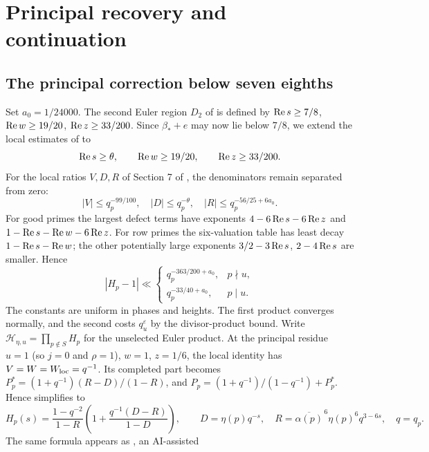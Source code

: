 \section{Principal recovery and continuation}\label{gex:recovery-section}

\subsection{The principal correction below seven eighths}

Set \(a_0=1/24000\). The second Euler region \(D_2\) of
\cite[Section 10.2 and (7.15)]{OAI26} is defined by
\(\operatorname{Re} s\ge7/8\), \(\operatorname{Re} w\ge19/20\), \(\operatorname{Re} z\ge33/200\). Since
\(\beta_*+e\) may now lie below \(7/8\), we extend the local estimates
of \cite[Sections 7 and 16]{OAI26} to
\begin{equation}\label{gex:second-euler-box}
 \operatorname{Re} s\ge\theta,\qquad \operatorname{Re} w\ge19/20,\qquad \operatorname{Re} z\ge33/200.
\end{equation}
For the local ratios \(V,D,R\) of Section 7 of \cite{OAI26},
the denominators remain separated from zero:
\[
 |V|\le q_p^{-99/100},\quad |D|\le q_p^{-\theta},\quad
 |R|\le q_p^{-56/25+6a_0}.
\]
For good primes the largest defect terms have exponents
\(4-6\operatorname{Re} s-6\operatorname{Re} z\) and
\(1-\operatorname{Re} s-\operatorname{Re} w-6\operatorname{Re} z\).
For row primes the six-valuation table has least decay
\(1-\operatorname{Re} s-\operatorname{Re} w\); the other potentially large exponents
\(3/2-3\operatorname{Re} s\), \(2-4\operatorname{Re} s\) are smaller. Hence
\begin{equation}\label{gex:local-euler-defect}
 |H_p-1|\ll
 \begin{cases}
 q_p^{-363/200+a_0},&p\nmid u,\\
 q_p^{-33/40+a_0},&p\mid u.
 \end{cases}
\end{equation}
The constants are uniform in phases and heights. The first product
converges normally, and the second costs \(q_u^\varepsilon\)
by the divisor-product bound. Write \(\mathcal H_{\eta,u}=\prod_{p\notin S}H_p\)
for the unselected Euler product. At the principal residue
\(u=1\) (so \(j=0\) and \(\rho=1\)), \(w=1\), \(z=1/6\), the local
identity \cite[(7.11)--(7.12)]{OAI26} has
\(V=W=W_{\rm loc}=q^{-1}\). Its completed part becomes
\(P_p^*=(1+q^{-1})(R-D)/(1-R)\), and
\(P_p=(1+q^{-1})/(1-q^{-1})+P_p^*\). Hence \cite[(7.12)]{OAI26}
simplifies to
\[
 H_p(s)=\frac{1-q^{-2}}{1-R}
       \left(1+\frac{q^{-1}(D-R)}{1-D}\right),\qquad
 D=\eta(p)q^{-s},\quad
 R=\overline{\alpha(p)}^{\,6}\eta(p)^6q^{3-6s},\quad q=q_p.
\]
The same formula appears as \cite[(8)]{KIN26}, an AI-assisted

